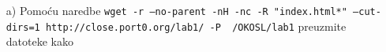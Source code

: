 \documentclass{exam}
\newcommand{\shell}[1]{\texttt{#1}}
\begin{document}
                                                                                                                                \begin{itemize}
                                                                                                                                    \item[a)]
                                                                                                                                    Pomoću
                                                                                                                                    naredbe
                                                                                                                                         \shell{wget
                                                                                                                                         -r
                                                                                                                                         --no-parent
                                                                                                                                         -nH
                                                                                                                                         -nc
                                                                                                                                         -R
                                                                                                                                         "index.html*"
                                                                                                                                         --cut-dirs=1
                                                                                                                                         http://close.port0.org/lab1/
                                                                                                                                         -P
                                                                                                                                         ~/OKOSL/lab1}
                                                                                                                                         preuzmite
                                                                                                                                         datoteke
                                                                                                                                         kako

\end{itemize}
\end{document}
